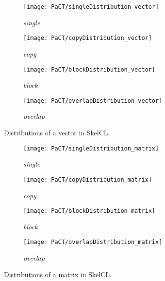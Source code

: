 \begin{figure}[tb]
  \centering
  \begin{subfigure}{.22\textwidth}
    \texttt{[image: PaCT/singleDistribution\_vector]}
    \caption{\emph{single}}
    \label{fig:distributions:single}
  \end{subfigure}
  \hfill
  \begin{subfigure}{.22\textwidth}
    \texttt{[image: PaCT/copyDistribution\_vector]}
    \caption{\emph{copy}}
    \label{fig:distributions:copy}
  \end{subfigure}
  \hfill
  \begin{subfigure}{.22\textwidth}
    \texttt{[image: PaCT/blockDistribution\_vector]}
    \caption{\emph{block}}
    \label{fig:distributions:block}
  \end{subfigure}
  \hfill
  \begin{subfigure}{.22\textwidth}
    \texttt{[image: PaCT/overlapDistribution\_vector]}
    \caption{\emph{overlap}}
    \label{fig:distributions:overlap}
  \end{subfigure}
  \caption{Distributions of a vector in SkelCL.}
  \label{fig:distributions}
  \bigskip
\end{figure}

\begin{figure}[tbp]
  \centering
  \begin{subfigure}{.22\textwidth}
    \texttt{[image: PaCT/singleDistribution\_matrix]}
    \caption{\emph{single}}
    \label{fig:Distribution_matrixs:single}
  \end{subfigure}
  \hfill
  \begin{subfigure}{.22\textwidth}
    \texttt{[image: PaCT/copyDistribution\_matrix]}
    \caption{\emph{copy}}
    \label{fig:Distribution_matrixs:copy}
  \end{subfigure}
  \hfill
  \begin{subfigure}{.22\textwidth}
    \texttt{[image: PaCT/blockDistribution\_matrix]}
    \caption{\emph{block}}
    \label{fig:Distribution_matrixs:block}
  \end{subfigure}
  \hfill
  \begin{subfigure}{.22\textwidth}
    \texttt{[image: PaCT/overlapDistribution\_matrix]}
    \caption{\emph{overlap}}
    \label{fig:Distribution_matrixs:overlap}
  \end{subfigure}
  \caption{Distributions of a matrix in SkelCL.}
  \label{fig:distributions_matrix}
\end{figure}


